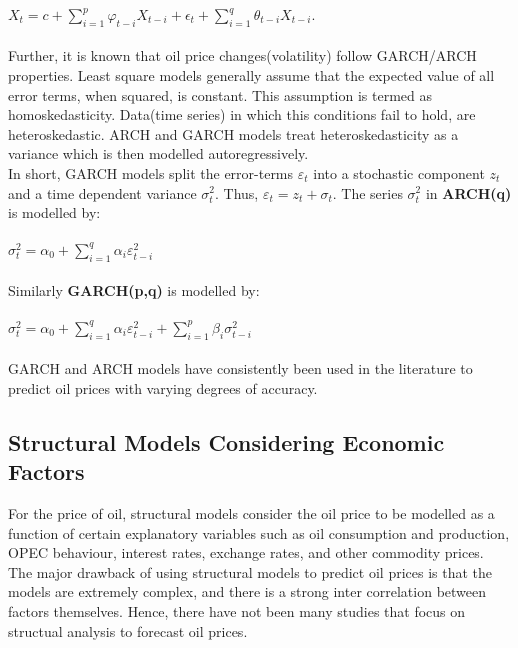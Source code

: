 \documentclass[runningheads]{llncs}
\begin{document}
$ X_{t} = c + \sum\limits_{i=1}^p \varphi_{t-i}X_{t-i} + \epsilon_{t} + \sum\limits_{i=1}^q \theta_{t-i}X_{t-i}$.\\
\\

\noindent Further, it is known that oil price changes(volatility) follow GARCH/ARCH properties. Least square models generally assume that the expected value of all error terms, when squared, is constant. This assumption is termed as homoskedasticity. Data(time series) in which this conditions fail to hold, are heteroskedastic. ARCH and GARCH models treat heteroskedasticity as a variance which is then modelled autoregressively.\cite{engle}\\

\noindent In short, GARCH models split the error-terms $\varepsilon_t$ into a stochastic component $z_{t}$ and a time dependent variance $\sigma^2_{t}$. Thus, $ \varepsilon_t = z_{t} + \sigma_{t}$. The series $\sigma^2_{t}$ in \textbf{ARCH(q)} is modelled by:\\\\

$\sigma^2_{t} = \alpha_{0} + \sum\limits_{i=1}^q \alpha_{i}\varepsilon_{t-i}^2 $\\\\

\noindent Similarly \textbf{GARCH(p,q)} is modelled by:\\\\

$\sigma^2_{t} = \alpha_{0} + \sum\limits_{i=1}^q \alpha_{i}\varepsilon_{t-i}^2 + \sum\limits_{i=1}^p \beta_{i}\sigma_{t-i}^2 $\\\\

\noindent GARCH and ARCH models have consistently been used in the literature to predict oil prices with varying degrees of accuracy. 

\subsection{Structural Models Considering Economic Factors}

For the price of oil, structural models consider the oil price to be modelled as a function of certain explanatory variables such as oil consumption and production, OPEC behaviour, interest rates, exchange rates, and other commodity prices. The major drawback of using structural models to predict oil prices is that the models are extremely complex, and there is a strong inter correlation between factors themselves. Hence, there have not been many studies that focus on structual analysis to forecast oil prices.\\
\end{document}
